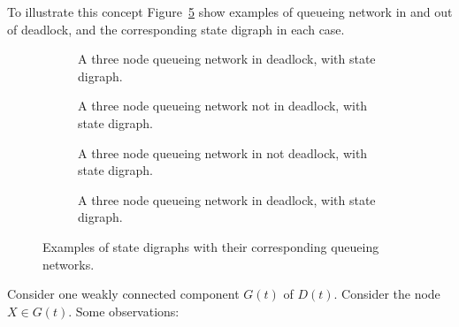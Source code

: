 \documentclass{article}
\begin{document}
To illustrate this concept Figure~\ref{fig:exampledigraphs} show examples of queueing network in and out of deadlock, and the corresponding state digraph in each case.

\begin{figure}[!htbp]
\begin{center}
  \begin{subfigure}{0.45\textwidth}
    \begin{center}
      
    \end{center}
    \caption{A three node queueing network in deadlock, with state digraph.}
    \label{fig:exampledigraph_deadlock}
  \end{subfigure}
  \hspace{6 mm}
  \begin{subfigure}{0.45\textwidth}
    \begin{center}
      
    \end{center}
    \caption{A three node queueing network not in deadlock, with state digraph.}
    \label{fig:exampledigraph_nodeadlock}
    \vspace{6 mm}
  \end{subfigure}
  \begin{subfigure}{0.45\textwidth}
    \begin{center}
      
    \end{center}
    \caption{A three node queueing network in not deadlock, with state digraph.}
    \label{fig:exampledigraph_nodeadlock}
  \end{subfigure}
  \hspace{6 mm}
  \begin{subfigure}{0.45\textwidth}
    \begin{center}
      
    \end{center}
    \caption{A three node queueing network in deadlock, with state digraph.}
    \label{fig:exampledigraph_nodeadlock}
    \vspace{6 mm}
  \end{subfigure}
  \end{center}
  \caption{Examples of state digraphs with their corresponding queueing networks.}
  \label{fig:exampledigraphs}
\end{figure}

Consider one weakly connected component $G(t)$ of $D(t)$. Consider the node $X \in G(t)$. Some observations:
\end{document}

